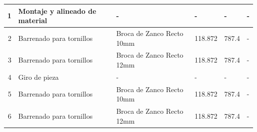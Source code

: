 \begin{table}[H]
\begin{tabular}{|r|p{10.75em}|p{11em}|p{3em}|p{3.25em}|p{3.5em}|}
    \hline
    \scriptsize 1     & \scriptsize Montaje y alineado de material & \scriptsize -     & \scriptsize {-} & \scriptsize{-} & \scriptsize {-} \\
    \hline
    \scriptsize 2     & \scriptsize Barrenado para tornillos & \scriptsize Broca de Zanco Recto 10mm & \scriptsize 118.872 & \scriptsize 787.4 & \scriptsize {-} \\
    \hline
    \scriptsize 3     & \scriptsize Barrenado para tornillos & \scriptsize Broca de Zanco Recto 12mm & \scriptsize 118.872 & \scriptsize 787.4 & \scriptsize {-} \\
    \hline
    \scriptsize 4     & \scriptsize Giro de pieza & \scriptsize -     & \scriptsize {-} & \scriptsize {-} & \scriptsize - \\
    \hline
    \scriptsize 5     & \scriptsize Barrenado para tornillos & \scriptsize Broca de Zanco Recto 10mm & \scriptsize 118.872 & \scriptsize 787.4 & \scriptsize - \\
    \hline
    \scriptsize 6     & \scriptsize Barrenado para tornillos & \scriptsize Broca de Zanco Recto 12mm & \scriptsize 118.872 & \scriptsize 787.4 & \scriptsize - \\
    \hline
    \end{tabular}%
  \label{tab:CO_MC2}%
\end{table}%


